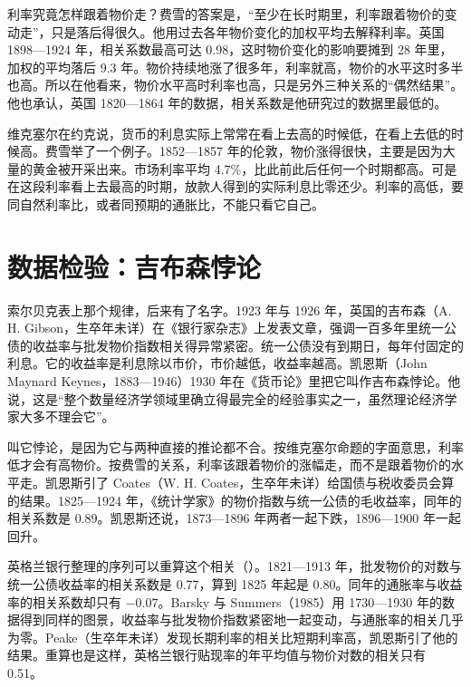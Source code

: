 利率究竟怎样跟着物价走？费雪的答案是，“至少在长时期里，利率跟着物价的变动走”，只是落后得很久\cite{fisher1930}。他用过去各年物价变化的加权平均去解释利率。英国 1898—1924 年，相关系数最高可达 0.98，这时物价变化的影响要摊到 28 年里，加权的平均落后 9.3 年\cite{fisher1930}。物价持续地涨了很多年，利率就高，物价的水平这时多半也高。所以在他看来，物价水平高时利率也高，只是另外三种关系的“偶然结果”\cite{fisher1930}。他也承认，英国 1820—1864 年的数据，相关系数是他研究过的数据里最低的\cite{fisher1930}。

\begin{pitfall}
维克塞尔在约克说，货币的利息实际上常常在看上去高的时候低，在看上去低的时候高\cite{wicksell1907}。费雪举了一个例子。1852—1857 年的伦敦，物价涨得很快，主要是因为大量的黄金被开采出来\cite{fisher1930}。市场利率平均 4.7\%，比此前此后任何一个时期都高。可是在这段利率看上去最高的时期，放款人得到的实际利息比零还少\cite{fisher1930}。利率的高低，要同自然利率比，或者同预期的通胀比，不能只看它自己。
\end{pitfall}

\section{数据检验：吉布森悖论}\label{sec:wicksell-test}

索尔贝克表上那个规律，后来有了名字。1923 年与 1926 年，英国的吉布森（A. H. Gibson，生卒年未详）在《银行家杂志》上发表文章，强调一百多年里统一公债的收益率与批发物价指数相关得异常紧密\cite{keynes1930,fisher1930}。统一公债没有到期日，每年付固定的利息。它的收益率是利息除以市价，市价越低，收益率越高。凯恩斯（John Maynard Keynes，1883—1946）1930 年在《货币论》里把它叫作吉布森悖论。他说，这是“整个数量经济学领域里确立得最完全的经验事实之一，虽然理论经济学家大多不理会它”\cite{keynes1930}。

叫它悖论，是因为它与两种直接的推论都不合。按维克塞尔命题的字面意思，利率低才会有高物价。按费雪的关系，利率该跟着物价的涨幅走，而不是跟着物价的水平走。凯恩斯引了 Coates（W. H. Coates，生卒年未详）给国债与税收委员会算的结果。1825—1924 年，《统计学家》的物价指数与统一公债的毛收益率，同年的相关系数是 0.89\cite{keynes1930}。凯恩斯还说，1873—1896 年两者一起下跌，1896—1900 年一起回升\cite{keynes1930}。

英格兰银行整理的序列可以重算这个相关（）。1821—1913 年，批发物价的对数与统一公债收益率的相关系数是 0.77，算到 1825 年起是 0.80\cite{boe2017}。同年的通胀率与收益率的相关系数却只有 $-0.07$\cite{boe2017}。Barsky 与 Summers（1985）用 1730—1930 年的数据得到同样的图景，收益率与批发物价指数紧密地一起变动，与通胀率的相关几乎为零\cite{barsky1985}。Peake（生卒年未详）发现长期利率的相关比短期利率高，凯恩斯引了他的结果\cite{keynes1930}。重算也是这样，英格兰银行贴现率的年平均值与物价对数的相关只有 0.51\cite{boe2017}。

